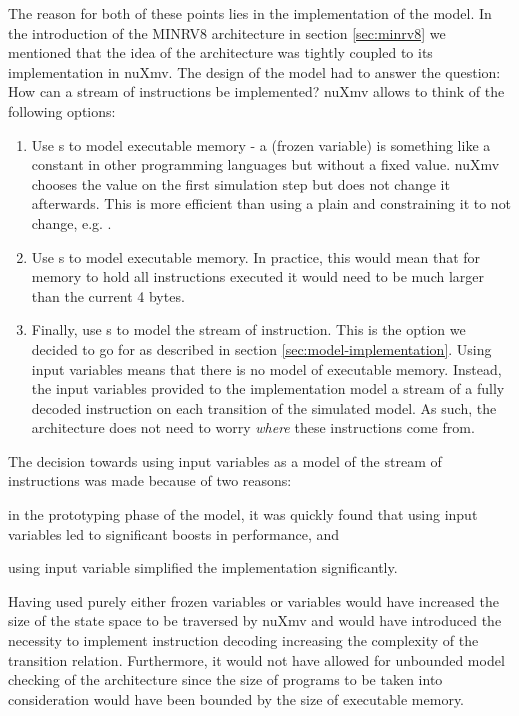 The reason for both of these points lies in the implementation of the model.
In the introduction of the MINRV8 architecture in section \ref{sec:minrv8} we mentioned that the idea of the architecture was tightly coupled to its implementation in nuXmv.
The design of the model had to answer the question: How can a stream of instructions be implemented?
nuXmv allows to think of the following options:
\begin{enumerate}
    \item \label{itm:exmem-frozen}
    Use s to model executable memory - a  (frozen variable) is something like a constant in other programming languages but without a fixed value.
    nuXmv chooses the value on the first simulation step but does not change it afterwards.
    This is more efficient than using a plain  and constraining it to not change, e.g. .
    \item \label{itm:exmem-var}
    Use s to model executable memory.
    In practice, this would mean that for memory to hold all instructions executed it would need to be much larger than the current 4 bytes.
    \item \label{itm:exmem-ivar}
    Finally, use s to model the stream of instruction.
    This is the option we decided to go for as described in section \ref{sec:model-implementation}.
    Using input variables means that there is no model of executable memory.
    Instead, the input variables provided to the implementation model a stream of a fully decoded instruction on each transition of the simulated model.
    As such, the architecture does not need to worry \textit{where} these instructions come from.
\end{enumerate}

The decision towards using input variables as a model of the stream of instructions was made because of two reasons:
\begin{enumerate*}[label=\alph*)]
    \item in the prototyping phase of the model, it was quickly found that using input variables led to significant boosts in performance, and
    \item using input variable simplified the implementation significantly.
\end{enumerate*}
Having used purely either frozen variables or variables would have increased the size of the state space to be traversed by nuXmv and would have introduced the necessity to implement instruction decoding increasing the complexity of the transition relation.
Furthermore, it would not have allowed for unbounded model checking of the architecture since the size of programs to be taken into consideration would have been bounded by the size of executable memory.

